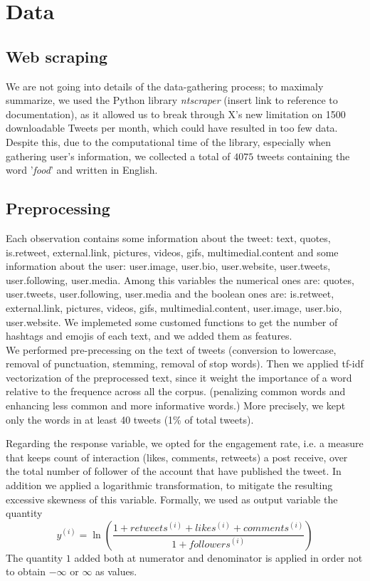 \documentclass{article}
\begin{document}
\section{Data}
\label{sec:data}

\subsection{Web scraping}
We are not going into details of the data-gathering process; to maximaly summarize, we used the Python library \textit{ntscraper} (insert link to reference to documentation), as it allowed us to break through X's new limitation on 1500 downloadable Tweets per month, which could have resulted in too few data. Despite this, due to the computational time of the library, especially when gathering user's information, we collected a total of $4075$ tweets containing the word '\textit{food}' and written in English.
\subsection{Preprocessing}
Each observation contains some information about the tweet: text, quotes, is.retweet, external.link, pictures, videos, gifs, multimedial.content and some information about the user: user.image, user.bio, user.website, user.tweets, user.following, user.media.
Among this variables the numerical ones are: quotes, user.tweets, user.following, user.media and the boolean ones are: is.retweet, external.link, pictures, videos, gifs, multimedial.content, user.image, user.bio, user.website.
\noindent We implemeted some customed functions to get the number of hashtags and emojis of each text, and we added them as features.\\
We performed pre-precessing on the text of tweets (conversion to lowercase, removal of punctuation, stemming, removal of stop words). Then we applied tf-idf vectorization of the preprocessed text, since it weight the importance of a word relative to the frequence across all the corpus. (penalizing common words and enhancing less common and more informative words.)
More precisely, we kept only the words in at least 40 tweets (1\% of total tweets).



\noindent Regarding the response variable, we opted for the engagement rate, i.e. a measure that keeps count of interaction (likes, comments, retweets) a post receive, over the total number of follower of the account that have published the tweet. In addition we applied a logarithmic transformation, to mitigate the resulting excessive skewness of this variable.
Formally, we used as output variable the quantity $$y^{(i)} = \ln \left( \frac{1+retweets^{(i)}+likes^{(i)}+comments^{(i)}}{1+followers^{(i)}} \right)$$
The quantity $1$ added both at numerator and denominator is applied in order not to obtain $-\infty$ or $\infty$ as values.
\end{document}
